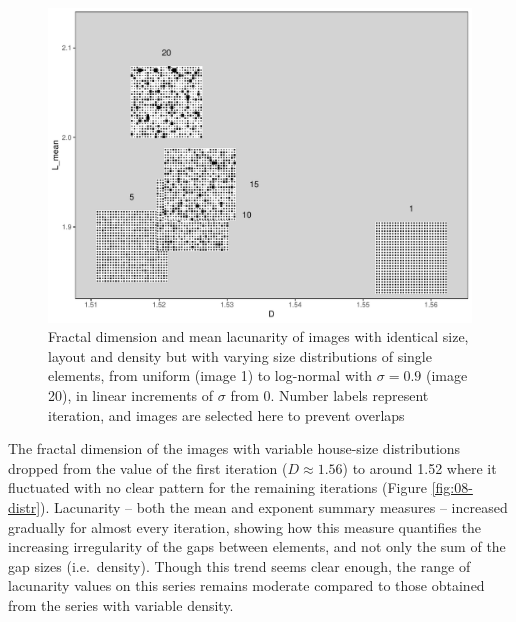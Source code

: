 \documentclass[
  12pt,
]{book}
\begin{document}
\begin{figure}
\hypertarget{fig:08-distr-im}{%
\centering
\includegraphics{Results/fig08_distr_im.pdf}
\caption{Fractal dimension and mean lacunarity of images with identical size, layout and density but with varying size distributions of single elements, from uniform (image 1) to log-normal with \(\sigma = 0.9\) (image 20), in linear increments of \(\sigma\) from 0. Number labels represent iteration, and images are selected here to prevent overlaps}\label{fig:08-distr-im}
}
\end{figure}

The fractal dimension of the images with variable house-size distributions dropped from the value of the first iteration (\(D \approx 1.56\)) to around 1.52 where it fluctuated with no clear pattern for the remaining iterations (Figure \ref{fig:08-distr}). Lacunarity -- both the mean and exponent summary measures -- increased gradually for almost every iteration, showing how this measure quantifies the increasing irregularity of the gaps between elements, and not only the sum of the gap sizes (i.e.~density). Though this trend seems clear enough, the range of lacunarity values on this series remains moderate compared to those obtained from the series with variable density.
\end{document}
